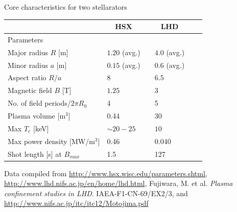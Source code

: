 \documentclass{beamer}
\begin{document}
\begin{frame}{Core characteristics for two stellarators}
\begin{table}\centering
\begin{tabular}{@{}llclcl@{}}\toprule[2 pt]
&\multicolumn{1}{c}{HSX} & \phantom{abc} & \multicolumn{1}{c}{LHD}  \\
\midrule
\phantom{a}Parameters & &&  \\
\phantom{a}Major radius $R$ [m] 	&	$1.20$ (avg.)  	&&	$4.0$ (avg.)		  	\\
\phantom{a}Minor radius $a$ [m] 	&	$0.15$ (avg.)	&& 	$0.6$ (avg.)	          	\\
\phantom{a}Aspect ratio	$R/a$           &       $8$      	&&	$6.5$        	  	\\
\phantom{a}Magnetic field $B$ [T]       &       $1.25$	        &&	$3$                       \\
\phantom{a}No. of field periods/$2\pi R_0$ &    4	        &&	5                       \\
\phantom{a}Plasma volume [$\text{m}^3$]	&	0.44     	&&	30			  	\\
\phantom{a}Max  $T_e$ [keV]	        &	$\sim 20 - 25$	&&	$10$		  	\\
\phantom{a}Max power density [MW/$\text{m}^3$]   	&       0.46  	&&	0.040 		  	\\
\phantom{a}Shot length [s] at $B_{max}$  &	1.5        	 && 	127		\\
\bottomrule[2 pt]
\end{tabular}
\label{tbl:tokamak_params_juxtaposition}
\end{table}

\tiny{Data compiled from \url{http://www.hsx.wisc.edu/parameters.shtml}, \url{http://www.lhd.nifs.ac.jp/en/home/lhd.html}, Fujiwara, M. et al. \emph{Plasma confinement studies in LHD}. IAEA-F1-CN-69/EX2/3, and \url{http://www.nifs.ac.jp/itc/itc12/Motojima.pdf}}

\end{frame}

\end{document}
